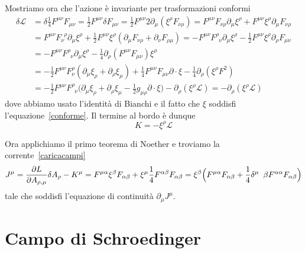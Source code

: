     Mostriamo ora che l'azione è invariante per trasformazioni conformi 
\begin{equation*}
\begin{aligned}
    \delta \mathcal L & = \delta \frac{1}{4} F^{\mu\nu} F_{\mu\nu} = \frac{1}{2} F^{\mu\nu} \delta F_{\mu\nu} = \frac{1}{2} F^{\mu\nu} 2 \partial_\mu (\xi^\rho F_{\nu \rho}) = F^{\mu\nu} F_{\nu\rho} \partial_\mu \xi^\rho + F^{\mu\nu} \xi^\rho \partial_\mu F_{\nu\rho} \\ & = F^{\mu\nu} F_\nu^{\phantom \nu \rho} \partial_\mu \xi^\rho + \frac{1}{2} F^{\mu\nu} \xi^\rho (\partial_\mu F_{\nu\rho} + \partial_\nu F_{\rho\mu}) = - F^{\mu\nu} F^\rho_{\phantom \rho \nu} \partial_\mu \xi^\rho - \frac{1}{2} F^{\mu\nu} \xi^\rho \partial_\rho F_{\mu\nu} \\ & = - F^{\mu\nu} F^\rho_{\phantom \rho \nu} \partial_\mu \xi^\rho - \frac{1}{4} \partial_\rho (F^{\mu\nu} F_{\mu\nu}) \xi^\rho \\ & = - \frac{1}{2} F^{\mu\nu} F^\rho_{\nu} (\partial_\mu \xi_\rho + \partial_\rho \xi_\mu) + \frac{1}{4} F^{\mu\nu} F_{\mu\nu} \partial \cdot \xi - \frac{1}{4} \partial_\rho (\xi^\rho F^2) \\ & = - \frac{1}{2} F^{\mu\nu} F^\rho_{\phantom \rho \nu} \Big ( \partial_\mu \xi_\rho + \partial_\rho \xi_\mu - \frac{1}{2} g_{\mu\rho} \partial \cdot \xi \Big) - \partial_\rho(\xi^\rho \mathcal L) = - \partial_\rho(\xi^\rho \mathcal L)
\end{aligned}
\end{equation*}
    dove abbiamo usato l'identità di Bianchi e il fatto che $\xi$ soddisfi l'equazione~\eqref{conforme}. Il termine al bordo è dunque 
\begin{equation*}
    K = - \xi^\rho \mathcal L
\end{equation*}

    Ora applichiamo il primo teorema di Noether e troviamo la corrente~\eqref{caricacampi} 
\begin{equation*}
    J^\mu = \pdv{L}{A_{\rho,\mu}} \delta A_\rho - K^\mu = F^{\mu\alpha} \xi^\beta F_{\alpha\beta} +  \xi^\mu \frac{1}{4} F^{\alpha\beta} F_{\alpha\beta} = \xi^\beta \Big ( F^{\mu \alpha} F_{\alpha \beta} + \frac{1}{4} \delta^\mu{\phantom \rho \beta} F^{\alpha \alpha} F_{\alpha \beta} \Big)
\end{equation*}
    tale che soddisfi l'equazione di continuità $\partial_\mu J^\mu$. 

\section{Campo di Schroedinger}

